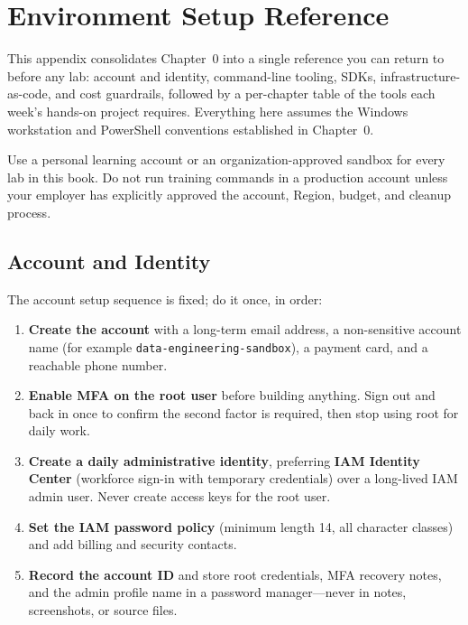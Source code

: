 \chapter{Environment Setup Reference}
%
This appendix consolidates Chapter~0 into a single reference you can return to before any lab:
account and identity, command-line tooling, SDKs, infrastructure-as-code, and cost guardrails,
followed by a per-chapter table of the tools each week's hands-on project requires. Everything
here assumes the Windows workstation and PowerShell conventions established in Chapter~0.

\begin{notebox}
Use a personal learning account or an organization-approved sandbox for every lab in this book.
Do not run training commands in a production account unless your employer has explicitly approved
the account, Region, budget, and cleanup process.
\end{notebox}

\section{Account and Identity}
%
The account setup sequence is fixed; do it once, in order:

\begin{enumerate}
    \item \textbf{Create the account} with a long-term email address, a non-sensitive account name
    (for example \texttt{data-engineering-sandbox}), a payment card, and a reachable phone number.
    \item \textbf{Enable MFA on the root user} before building anything. Sign out and back in once
    to confirm the second factor is required, then stop using root for daily work.
    \item \textbf{Create a daily administrative identity}, preferring \textbf{IAM Identity Center}
    (workforce sign-in with temporary credentials) over a long-lived IAM admin user. Never create
    access keys for the root user.
    \item \textbf{Set the IAM password policy} (minimum length 14, all character classes) and add
    billing and security contacts.
    \item \textbf{Record the account ID} and store root credentials, MFA recovery notes, and the
    admin profile name in a password manager---never in notes, screenshots, or source files.
\end{enumerate}

